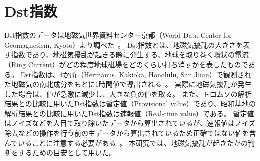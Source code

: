 \chapter{Dst指数}
\label{app:dst}
Dst指数のデータは地磁気世界資料センター京都（World Data Center for Geomagnetism, Kyoto）より調べた~\cite{wdc2022creditdst}。
Dst指数とは、地磁気擾乱の大きさを表す指数であり、地磁気擾乱が起きる際に発生する、地球を取り巻く環状の電流（Ring Current）がどの程度地球磁場をどのくらい打ち消すかを表したものである。
Dst指数は、4か所（Hermanus, Kakioka, Honolulu, San Juan）で観測された地磁気の南北成分をもとに1時間値で導出される~\cite{sugiura1986dst}。
実際に地磁気擾乱が発生した場合は、値が急激に減少し、大きな負の値を取る。
また、トロムソの解析結果との比較に用いたDst指数は暫定値（Provisional value）であり、昭和基地の解析結果との比較に用いたDst指数は速報値（Real-time value）である。
暫定値はノイズなどを人目で取り除いたデータから算出されているが、速報値はノイズ除去などの操作を行う前の生データから算出されているため正確ではない値を含んでいることに注意する必要がある~\cite{wdc2022aedst}。
本研究では、地磁気擾乱が起きたかの判断をするための目安として用いた。
